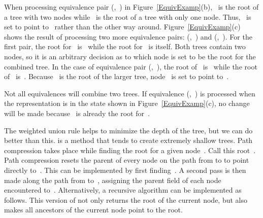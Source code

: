 \begin{example}
When processing equivalence pair (,~) in
Figure~\ref{EquivExamp}(b), ~is the root of a tree with two
nodes while ~is the root of a tree with only one node.
Thus, ~is set to point to~ rather than the other way
around.
Figure~\ref{EquivExamp}(c) shows the result of processing two more
equivalence pairs: (,~) and (,~).
For the first pair, the root for~ is~ while the root
for~ is itself.
Both trees contain two nodes, so it is an arbitrary decision as to
which node is set to be the root for the combined tree.
In the case of equivalence pair (,~),
the root of~ is~ while the
root of~ is~.
Because~ is the root of the larger tree, node~ is set
to point to~.
\end{example}

Not all equivalences will combine two trees.
If equivalence (,~) is processed when the
representation is in the state shown in Figure~\ref{EquivExamp}(c),
no change will be made because~ is already the root
for~.

The weighted union rule helps to minimize the depth of the tree, but
we can do better than this.
 is a method that tends to create extremely
shallow trees.
Path compression takes place while finding the root
for a given node~.
Call this root~.
Path compression resets the parent of every node on the path from
 to  to point directly to~.
This can be implemented by first finding~.
A second pass is then made along the path from  to~,
assigning the parent field of each node encountered to~.
Alternatively, a recursive algorithm can be implemented as follows.
This version of  not only returns the root of the
current node, but also makes all ancestors of the current node point
to the root.



